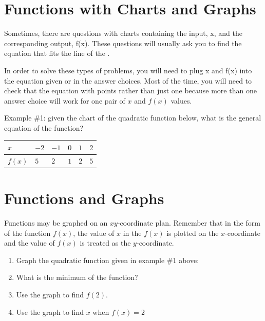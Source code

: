 \vfill
\newpage
\section{Functions with Charts and Graphs}

Sometimes, there are questions with charts containing the input, x, and the corresponding output, f(x). These questions will usually ask you to find the equation that fits the line of the \longline.

\bigskip
In order to solve these types of problems, you will need to plug x and f(x) into the equation given or in the answer choices. Most of the time, you will need to check that the equation with \longline points rather than just one because more than one answer choice will work for one pair of $x$ and $f(x)$ values.

\bigskip
Example \#1: given the chart of the quadratic function below, what is the general equation of the function?

\bigskip
\begin{spacing}{1.5}
\end{spacing}

\section{Functions and Graphs}

Functions may be graphed on an $xy$-coordinate plan. Remember that in the form of the function $f(x)$, the value of $x$ in the $f(x)$ is plotted on the $x$-coordinate and the value of $f(x)$ is treated as the $y$-coordinate.

\begin{enumerate}
\item Graph the quadratic function given in example \#1 above:

\plane

\item What is the minimum of the function?
\item Use the graph to find $f(2)$.
\item Use the graph to find $x$ when $f(x)=2$
\end{enumerate}

